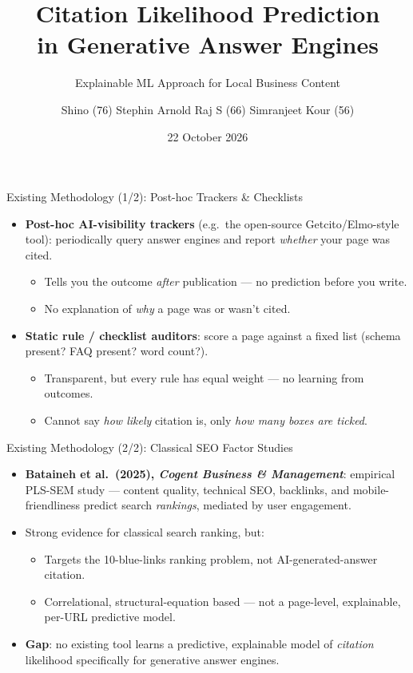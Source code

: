\documentclass[aspectratio=169]{beamer}
\title[Citation Likelihood Prediction]{Citation Likelihood Prediction\\in Generative Answer Engines}
\subtitle{Explainable ML Approach for Local Business Content}
\author{Shino (76) \quad Stephin Arnold Raj S (66) \quad Simranjeet Kour (56)}
\institute{CSD 415 Project Phase I\\Group 18, NSS College of Engineering\\Guide: Reshma Sudhakaran}
\date{22 October 2026}
\begin{document}
\begin{frame}
  \titlepage
\end{frame}

\begin{frame}{Existing Methodology (1/2): Post-hoc Trackers \& Checklists}
  \begin{itemize}
    \item \textbf{Post-hoc AI-visibility trackers} (e.g.\ the open-source Getcito/Elmo-style tool): periodically query answer engines and report \emph{whether} your page was cited.
    \begin{itemize}
      \item Tells you the outcome \emph{after} publication — no prediction before you write.
      \item No explanation of \emph{why} a page was or wasn't cited.
    \end{itemize}
    \item \textbf{Static rule / checklist auditors}: score a page against a fixed list (schema present? FAQ present? word count?).
    \begin{itemize}
      \item Transparent, but every rule has equal weight — no learning from outcomes.
      \item Cannot say \emph{how likely} citation is, only \emph{how many boxes are ticked}.
    \end{itemize}
  \end{itemize}
\end{frame}

\begin{frame}{Existing Methodology (2/2): Classical SEO Factor Studies}
  \begin{itemize}
    \item \textbf{Bataineh et al.\ (2025), \emph{Cogent Business \& Management}}: empirical PLS-SEM study — content quality, technical SEO, backlinks, and mobile-friendliness predict search \emph{rankings}, mediated by user engagement.
    \item Strong evidence for classical search ranking, but:
    \begin{itemize}
      \item Targets the 10-blue-links ranking problem, not AI-generated-answer citation.
      \item Correlational, structural-equation based — not a page-level, explainable, per-URL predictive model.
    \end{itemize}
    \item \textbf{Gap}: no existing tool learns a predictive, explainable model of \emph{citation} likelihood specifically for generative answer engines.
  \end{itemize}
\end{frame}
\end{document}
